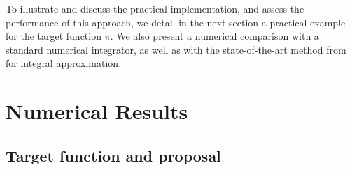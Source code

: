 \documentclass[review]{elsarticle}
\newcommand{\cred}{\textcolor{red}}
\newcommand{\normalized}{\tilde}
\newcommand{\Var}{\mathrm{Var}}
\def\x{{\bf x}}
\newcommand{\emilie}[1]{\textcolor{magenta}{\textbf{[{\em EMILIE SAYS}: #1]}}}
\newcommand{\victor}[1]{\textcolor{blue}{\textbf{[{\em VICTOR SAYS}: #1]}}}
\begin{document}
To illustrate and discuss the practical implementation, and assess the performance of this approach, we detail in the next section a practical example for the target function $\pi$. We also present a numerical comparison with a standard numerical integrator, as well as with the state-of-the-art method from \cite{evans1997approximation} for integral approximation.



\section{Numerical Results}
\label{sec_logistic}
\subsection{Target function and proposal}
\end{document}
